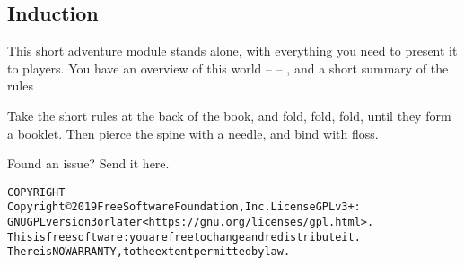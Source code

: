 \subsection*{Induction}

\begin{multicols}{2}
\noindent
This short adventure module stands alone, with everything you need to present it to players.
You have an overview of this world --  -- , and a short summary of the rules .

Take the short rules at the back of the book, and fold, fold, fold, until they form a booklet.
Then pierce the spine with a needle, and bind with floss.

\begin{center}
  
  Found an issue?
  Send it here.
\end{center}

\end{multicols}

\begin{alltt}
COPYRIGHT
       Copyright \copyright 2019 Free Software Foundation, Inc.  License GPLv3+:
  GNU GPL version 3 or later <https://gnu.org/licenses/gpl.html>.
       This is free software: you are free to change and redistribute it.
  There is NO WARRANTY, to the extent permitted by law.

\end{alltt}
